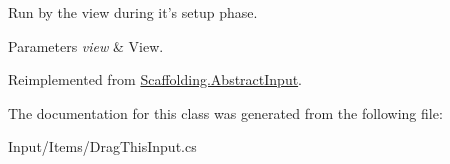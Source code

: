 Run by the view during it's setup phase. 


\begin{DoxyParams}{Parameters}
{\em view} & View.\\
\hline
\end{DoxyParams}


Reimplemented from \hyperlink{class_scaffolding_1_1_abstract_input_a598859c6342920d2b0c985310e6e9476}{Scaffolding.\+Abstract\+Input}.



The documentation for this class was generated from the following file\+:\begin{DoxyCompactItemize}
\item 
Input/\+Items/Drag\+This\+Input.\+cs\end{DoxyCompactItemize}
